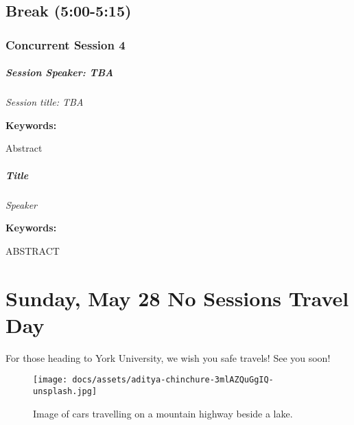 \documentclass[
]{book}
\begin{document}
\hypertarget{break-500-515}{%
\section*{Break (5:00-5:15)}\label{break-500-515}}

\hypertarget{concurrent-session-4}{%
\subsection*{Concurrent Session 4}\label{concurrent-session-4}}

\begin{speaker}
\hypertarget{session-speaker-tba}{%
\paragraph{\texorpdfstring{Session Speaker:
\textbf{TBA}}{Session Speaker: TBA}}\label{session-speaker-tba}}

\emph{Session title: TBA}

\textbf{Keywords:}

Abstract
\end{speaker}

\begin{speaker}
\hypertarget{title}{%
\paragraph{\texorpdfstring{\textbf{Title}}{Title}}\label{title}}

\emph{Speaker}

\textbf{Keywords:}

ABSTRACT
\end{speaker}

\hypertarget{sunday-may-28-no-sessions-travel-day}{%
\chapter{Sunday, May 28 \textbar{} No Sessions Travel Day}\label{sunday-may-28-no-sessions-travel-day}}

For those heading to York University, we wish you safe travels! See you soon!

\begin{figure}
\centering
\texttt{[image: docs/assets/aditya-chinchure-3mlAZQuGgIQ-unsplash.jpg]}
\caption{Image of cars travelling on a mountain highway beside a lake.}
\end{figure}
\end{document}
